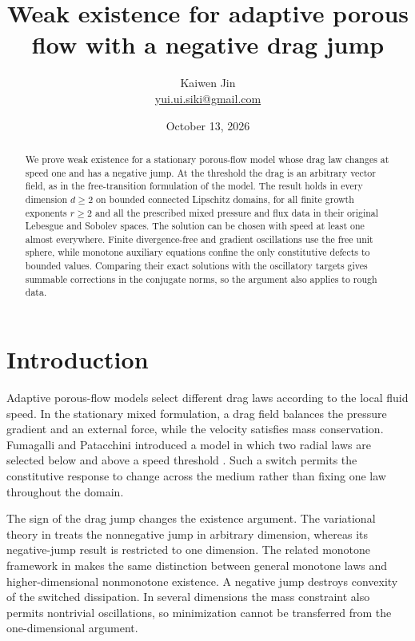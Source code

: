 \documentclass[11pt]{article}
\title{Weak existence for adaptive porous flow with a negative drag jump}
\author{Kaiwen Jin\\\small\href{mailto:yui.ui.siki@gmail.com}{yui.ui.siki@gmail.com}}
\date{October 13, 2026}
\theoremstyle{remark}
\begin{document}
\maketitle

\begin{abstract}
We prove weak existence for a stationary porous-flow model whose drag law
changes at speed one and has a negative jump. At the threshold the drag is
an arbitrary vector field, as in the free-transition formulation of the model.
The result holds in every dimension $d\ge2$ on bounded connected Lipschitz
domains, for all finite growth exponents $r\ge2$ and all the prescribed mixed
pressure and flux data in their original Lebesgue and Sobolev spaces.
The solution can be chosen with speed at least one almost everywhere.
Finite divergence-free and gradient oscillations use the free unit sphere,
while monotone auxiliary equations confine the only constitutive defects
to bounded values. Comparing their exact solutions with the oscillatory
targets gives summable corrections in the conjugate norms, so the argument
also applies to rough data.
\end{abstract}

\section{Introduction}\label{sec:intro}
Adaptive porous-flow models select different drag laws according to the
local fluid speed. In the stationary mixed formulation, a drag field balances
the pressure gradient and an external force, while the velocity satisfies mass
conservation. Fumagalli and Patacchini introduced a model in which two radial
laws are selected below and above a speed threshold \cite{FP22}. Such a
switch permits the constitutive response to change across the medium rather
than fixing one law throughout the domain.

The sign of the drag jump changes the existence argument. The variational
theory in \cite[Theorems 4.10--4.11]{FP22} treats the nonnegative jump in
arbitrary dimension, whereas its negative-jump result is restricted to one
dimension. The related monotone framework in
\cite[Theorem 3.3, Remark 3.4 and Corollary 4.5]{FPpreprint} makes the same
distinction between general monotone laws and higher-dimensional nonmonotone
existence. A negative jump destroys convexity of the switched dissipation.
In several dimensions the mass constraint also permits nontrivial oscillations,
so minimization cannot be transferred from the one-dimensional argument.
\end{document}
